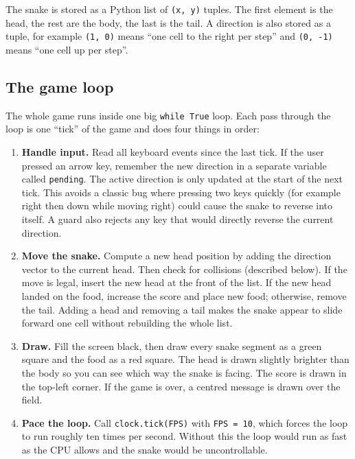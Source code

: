 The snake is stored as a Python list of \texttt{(x, y)} tuples. The
first element is the head, the rest are the body, the last is the tail.
A direction is also stored as a tuple, for example \texttt{(1, 0)} means
``one cell to the right per step'' and \texttt{(0, -1)} means ``one cell
up per step''.

\subsection*{The game loop}

The whole game runs inside one big \texttt{while True} loop. Each pass
through the loop is one ``tick'' of the game and does four things in
order:

\begin{enumerate}
    \item \textbf{Handle input.} Read all keyboard events since the last
    tick. If the user pressed an arrow key, remember the new direction
    in a separate variable called \texttt{pending}. The active direction
    is only updated at the start of the next tick. This avoids a classic
    bug where pressing two keys quickly (for example right then down
    while moving right) could cause the snake to reverse into itself.
    A guard also rejects any key that would directly reverse the current
    direction.

    \item \textbf{Move the snake.} Compute a new head position by adding
    the direction vector to the current head. Then check for collisions
    (described below). If the move is legal, insert the new head at the
    front of the list. If the new head landed on the food, increase the
    score and place new food; otherwise, remove the tail. Adding a head
    and removing a tail makes the snake appear to slide forward one
    cell without rebuilding the whole list.

    \item \textbf{Draw.} Fill the screen black, then draw every snake
    segment as a green square and the food as a red square. The head is
    drawn slightly brighter than the body so you can see which way the
    snake is facing. The score is drawn in the top-left corner. If the
    game is over, a centred message is drawn over the field.

    \item \textbf{Pace the loop.} Call \texttt{clock.tick(FPS)} with
    \texttt{FPS = 10}, which forces the loop to run roughly ten times
    per second. Without this the loop would run as fast as the CPU
    allows and the snake would be uncontrollable.
\end{enumerate}

